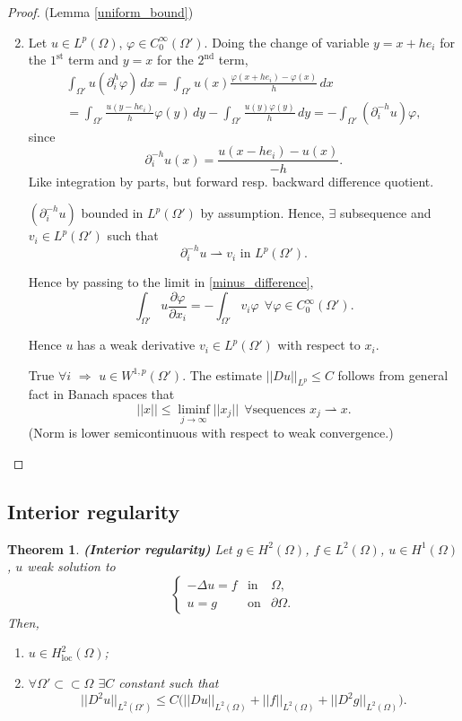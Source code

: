 \documentclass[12pt]{article}
\newtheorem{theorem}{Theorem}[section]
\theoremstyle{definition}
\begin{document}
\begin{proof}
(Lemma \ref{uniform_bound})
\begin{enumerate}[label=(\roman*)]
\setcounter{enumi}{1}
\item Let $u\in L^p(\Omega)$, $\varphi\in C_0^\infty(\Omega')$. Doing the change of variable $y=x+he_i$ for the $1^\text{st}$ term and $y=x$ for the $2^\text{nd}$ term,
\begin{multline}\tag{$*$}\label{minus_difference}
\int_{\Omega'}u(\partial_i^h\varphi)\,dx=\int_{\Omega'}u(x)\frac{\varphi(x+he_i)-\varphi(x)}h\,dx\\
=\int_{\Omega'}\frac{u(y-he_i)}h\varphi(y)\,dy-\int_{\Omega'}\frac{u(y)\varphi(y)}h\,dy=-\int_{\Omega'}(\partial_i^{-h}u)\varphi,
\end{multline}
since
\[\partial_i^{-h}u(x)=\frac{u(x-he_i)-u(x)}{-h}.\]
Like integration by parts, but forward resp. backward difference quotient.

$(\partial_i^{-h}u)$ bounded in $L^p(\Omega')$ by assumption. Hence, $\exists$ subsequence and $v_i\in L^p(\Omega')$ such that
\[\partial_i^{-h}u\rightharpoonup v_i\text{ in }L^p(\Omega').\]

Hence by passing to the limit in \eqref{minus_difference},
\[\int_{\Omega'}u\frac{\partial\varphi}{\partial x_i}=-\int_{\Omega'}v_i\varphi\ \ \forall\varphi\in C_0^\infty(\Omega').\]

Hence $u$ has a weak derivative $v_i\in L^p(\Omega')$ with respect to $x_i$.

True $\forall i$ $\Rightarrow$ $u\in W^{1,p}(\Omega')$. The estimate $||Du||_{L^p}\leq C$ follows from general fact in Banach spaces that
\[||x||\leq\liminf_{j\to\infty}||x_j||\ \ \forall\text{sequences }x_j\rightharpoonup x.\]
(Norm is lower semicontinuous with respect to weak convergence.)
\end{enumerate}
\end{proof}

\subsection{Interior regularity}
\begin{theorem}\label{interior_regularity}
\emph{\textbf{(Interior regularity)}} Let $g\in H^2(\Omega)$, $f\in L^2(\Omega)$, $u\in H^1(\Omega)$, $u$ weak solution to
\[\left\{\begin{array}{rcl}-\Delta u=f&\text{in}&\Omega,\\u=g&\text{on}&\partial\Omega.\end{array}\right.\]
Then,
\begin{enumerate}[label=(\roman*)]
\item $u\in H_\text{loc}^2(\Omega)$;
\item $\forall\Omega'\subset\subset\Omega$ $\exists C$ constant such that
\[||D^2u||_{L^2(\Omega')}\leq C\big(||Du||_{L^2(\Omega)}+||f||_{L^2(\Omega)}+||D^2g||_{L^2(\Omega)}\big).\]
\end{enumerate}
\end{theorem}
\end{document}
